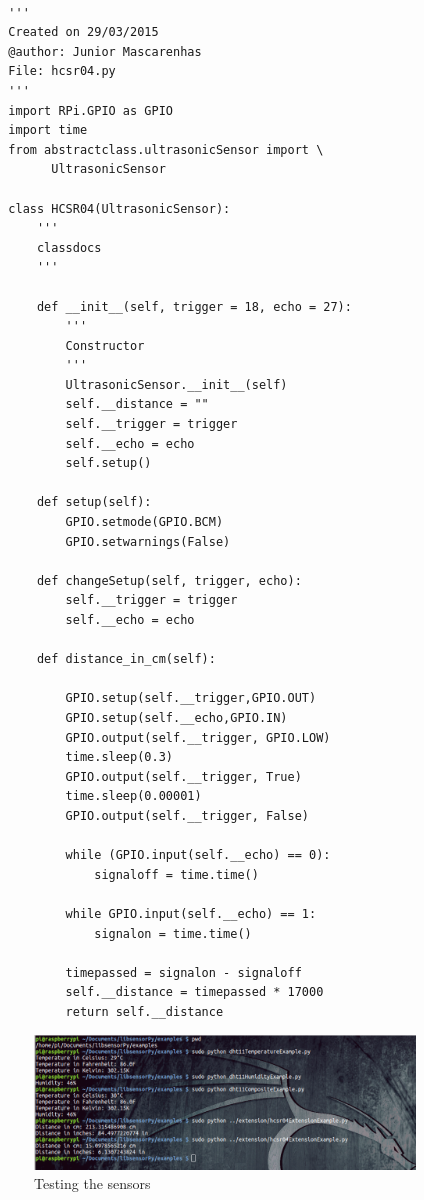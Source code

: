 \documentclass{acm_proc_article-sp}
\begin{document}
\renewcommand{\theFancyVerbLine}{
  \sffamily\textcolor[rgb]{0.5,0.5,0.5}{\scriptsize\arabic{FancyVerbLine}}}
\begin{verbatim}

  '''
  Created on 29/03/2015
  @author: Junior Mascarenhas
  File: hcsr04.py
  '''
  import RPi.GPIO as GPIO
  import time
  from abstractclass.ultrasonicSensor import \
  		UltrasonicSensor

  class HCSR04(UltrasonicSensor):
      '''
      classdocs
      '''

      def __init__(self, trigger = 18, echo = 27):
          '''
          Constructor
          '''
          UltrasonicSensor.__init__(self)
          self.__distance = ""
          self.__trigger = trigger
          self.__echo = echo
          self.setup()
        
      def setup(self):
          GPIO.setmode(GPIO.BCM)
          GPIO.setwarnings(False)

      def changeSetup(self, trigger, echo):
          self.__trigger = trigger
          self.__echo = echo

      def distance_in_cm(self):

          GPIO.setup(self.__trigger,GPIO.OUT)
          GPIO.setup(self.__echo,GPIO.IN)
          GPIO.output(self.__trigger, GPIO.LOW)
          time.sleep(0.3)
          GPIO.output(self.__trigger, True)
          time.sleep(0.00001)
          GPIO.output(self.__trigger, False)

          while (GPIO.input(self.__echo) == 0):
              signaloff = time.time()

          while GPIO.input(self.__echo) == 1:
              signalon = time.time()

          timepassed = signalon - signaloff
          self.__distance = timepassed * 17000
          return self.__distance

\end{verbatim}
\begin{figure}[ht]
    \centering
    	\includegraphics[width=0.9\textwidth]{pictures/tests.png}
    		\caption{Testing the sensors}  
    		\label{fig:results}  	
\end{figure}
\end{document}
